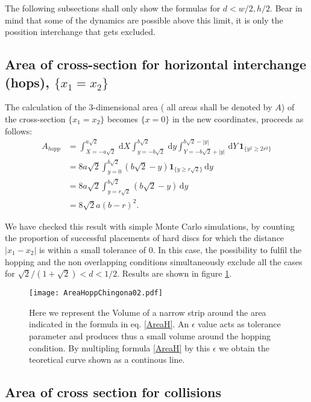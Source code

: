 \documentclass[a4paper,10pt, jcp, aps, preprint]{revtex4-1}
\newcommand{\rd}{\, \mathrm{d}}
\newcommand{\indicator}[1]{\mathbf{1}_{ \{   #1 \} } }
\begin{document}
The following subsections shall only show the formulas for $d<w/2, h/2$.
Bear in mind that some of the dynamics are possible above this limit,
it is only the possition interchange that gets excluded. 

\subsection{Area of cross-section for horizontal interchange (hops), 
$\{x_1 = x_2\}$}

The calculation of the $3$-dimensional area  ( all areas shall be 
denoted by $A$)
of the cross-section 
$\{x_1 = x_2\}$ becomes 
$\{ x=0 \}$ in the new coordinates, proceeds as follows:
\begin{align}
 A_{hopp} &= \int_{X=-a \sqrt{2} }^{a \sqrt{2}}  \rd X
 \int_{y=-b \sqrt{2}}^{b \sqrt{2}} \rd y
\int_{Y=-b \sqrt{2} + |y| }^{b \sqrt{2}-|y|}  \rd Y
\, \indicator{y^2 \ge 2r^2 } \\
&= 8 a \sqrt{2} \int_{y=0}^{b \sqrt{2}} 
\left( b \sqrt{2} - y \right)  \indicator{y \ge r \sqrt{2} }  \rd y \\
&= 8 a \sqrt{2} \int_{y= r\sqrt{2}}^{b \sqrt{2}}  \left( b \sqrt{2} - y \right)  \rd y \\
&= 8 \sqrt{2} a ( b - r )^2. \label{AreaH}
\end{align}

We have checked this result with simple Monte Carlo simulations, 
by counting the proportion of successful placements of hard discs 
for which the distance 
$|x_1 - x_2|$ is within a small tolerance of $0$. 
In this case, the possibility to fulfil
the hopping and the non overlapping conditions simultaneously exclude 
all the cases for $\sqrt{2}/(1+\sqrt{2}) <d<1/2$. 
Results are shown in figure \ref{AreaHopp01}.

\begin{figure}[h]
\centering
\texttt{[image: AreaHoppChingona02.pdf]}
\caption{Here we represent the Volume of a narrow strip around the area
  indicated in the formula in eq. \ref{AreaH}. An $\epsilon$ value acts as
tolerance parameter and produces thus a small volume around the 
hopping condition. By multipling formula \ref{AreaH} by this $\epsilon$
we obtain the teoretical curve shown as a continous line.} 
\label{AreaHopp01}
\end{figure}


\subsection{Area of cross section for collisions}
\end{document}
